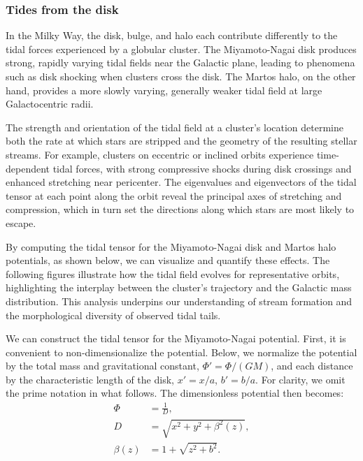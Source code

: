         \subsubsection{Tides from the disk}
            In the Milky Way, the disk, bulge, and halo each contribute differently to the tidal forces experienced by a globular cluster. The Miyamoto-Nagai disk produces strong, rapidly varying tidal fields near the Galactic plane, leading to phenomena such as disk shocking when clusters cross the disk. The Martos halo, on the other hand, provides a more slowly varying, generally weaker tidal field at large Galactocentric radii.

            The strength and orientation of the tidal field at a cluster's location determine both the rate at which stars are stripped and the geometry of the resulting stellar streams. For example, clusters on eccentric or inclined orbits experience time-dependent tidal forces, with strong compressive shocks during disk crossings and enhanced stretching near pericenter. The eigenvalues and eigenvectors of the tidal tensor at each point along the orbit reveal the principal axes of stretching and compression, which in turn set the directions along which stars are most likely to escape.

            By computing the tidal tensor for the Miyamoto-Nagai disk and Martos halo potentials, as shown below, we can visualize and quantify these effects. The following figures illustrate how the tidal field evolves for representative orbits, highlighting the interplay between the cluster's trajectory and the Galactic mass distribution. This analysis underpins our understanding of stream formation and the morphological diversity of observed tidal tails.

            We can construct the tidal tensor for the Miyamoto-Nagai potential. First, it is convenient to non-dimensionalize the potential. Below, we normalize the potential by the total mass and gravitational constant, $\Phi\prime = \Phi / (GM)$, and each distance by the characteristic length of the disk, $x\prime = x/a$, $b\prime = b/a$. For clarity, we omit the prime notation in what follows. The dimensionless potential then becomes:            
            \begin{eqnarray}
                \Phi   &= \frac{1}{D},\\
                D       &= \sqrt{x^2 + y^2 + \beta^2(z)},\\
                \beta(z)   &= 1 + \sqrt{z^2 + b^2}.
            \end{eqnarray}
            
